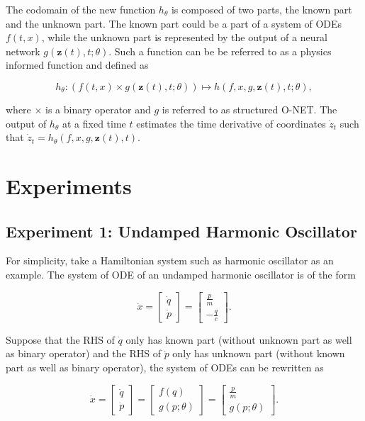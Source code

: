\documentclass[
	parskip, 			   %
	twoside, 			   %
	DIV=14, 			   %
	BCOR=15.0mm, 		   %
	headsepline, 		   %
	open=right, 		   %
	captions=tableheading, %
	bibliography=totoc,    %
	numbers=noenddot       %
]{scrreprt}
\begin{document}
The codomain of the new function $h_{\theta}$ is composed of two parts, the known part and the unknown part. The known part could be a part of a system of ODEs $f(t, x)$, while the unknown part is represented by the output of a neural network $g(\mathbf{z}(t), t; \theta)$. Such a function can be be referred to as a physics informed function and defined as

\begin{equation}
    \label{eq:physics_informed_function}
    h_{\theta} : \left( f(t, x) \times g(\mathbf{z}(t), t; \theta) \right) \longmapsto h(f, x, g, \mathbf{z}(t), t; \theta),
\end{equation}

where $\times$ is a binary operator and $g$ is referred to as structured O-NET. The output of $h_{\theta}$ at a fixed time $t$ estimates the time derivative of coordinates $\dot z_{t}$ such that $\dot z_{t} = h_{\theta}(f, x, g, \mathbf{z}(t), t)$.


\section{Experiments}

\subsection{Experiment 1: Undamped Harmonic Oscillator}
For simplicity, take a Hamiltonian system such as harmonic oscillator as an example. The system of ODE of an undamped harmonic oscillator is of the form

\begin{equation}
    \label{eq:ODE_udho}
    \dot{x} =
    \begin{bmatrix}
    \dot{q}\\
    \dot{p}
    \end{bmatrix}
    =
    \begin{bmatrix}
    \frac{p}{m}\\
    -\frac{q}{c}
    \end{bmatrix}.
\end{equation}

Suppose that the RHS of $\dot{q}$ only has known part (without unknown part as well as binary operator) and the RHS of $\dot{p}$ only has unknown part (without known part as well as binary operator), the system of ODEs can be rewritten as

\begin{equation}
    \label{eq:structured_ODE_udho}
    \dot{x} =
    \begin{bmatrix}
    \dot{q}\\
    \dot{p}
    \end{bmatrix}
    =
    \begin{bmatrix}
    {f(q)}\\
    {g(p;\theta)}
    \end{bmatrix}
    =
    \begin{bmatrix}
    \frac{p}{m}\\
    g(p;\theta)
    \end{bmatrix}.
\end{equation}
\end{document}
